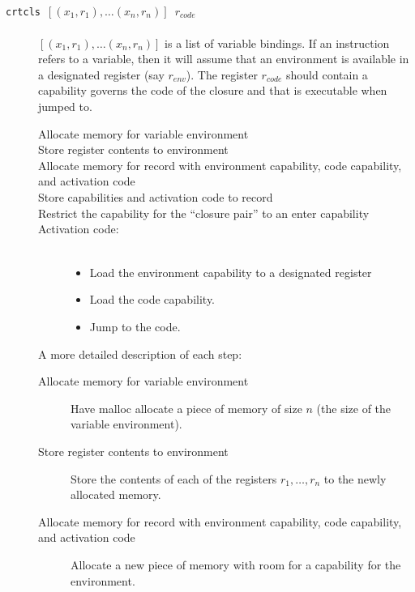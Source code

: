 \documentclass[a4paper]{article}
\newcommand{\forcenewline}{$\phantom{v}$\\}
\newcommand{\var}[1]{\mathit{#1}}
\begin{document}
              \begin{description}
              \item[\texttt{crtcls $[(x_1,r_1),\dots(x_n,r_n)]$ $r_{\var{code}}$}] \forcenewline
                $[(x_1,r_1),\dots(x_n,r_n)]$ is a list of variable bindings. If an instruction refers to a variable, then it will assume that an environment is available in a designated register (say $r_{\var{env}}$). The register $r_{\var{code}}$ should contain a capability governs the code of the closure and that is executable when jumped to.
                \begin{description}
                \item[Allocate memory for variable environment]
                \item[Store register contents to environment]
                \item[Allocate memory for record with environment capability, code capability, and activation code]
                \item[Store capabilities and activation code to record]
                \item[Restrict the capability for the ``closure pair'' to an enter capability]
                \item[Activation code:] \forcenewline
                  \begin{itemize}
                  \item Load the environment capability to a designated register
                  \item Load the code capability.
                  \item Jump to the code.
                  \end{itemize}
                \end{description}
                A more detailed description of each step:
                \begin{description}
                \item[Allocate memory for variable environment] Have malloc allocate a piece of memory of size $n$ (the size of the variable environment). 
                \item[Store register contents to environment] Store the contents of each of the registers $r_1,\dots,r_n$ to the newly allocated memory.
                \item[Allocate memory for record with environment capability, code capability, and activation code] Allocate a new piece of memory with room for a capability for the environment.

\end{description}
\end{description}
\end{document}
